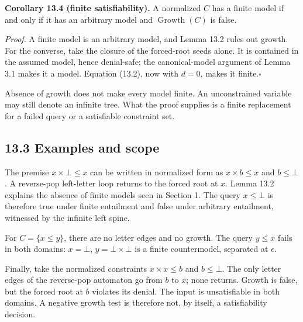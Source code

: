 \documentclass[
  11pt,
  a4paper,
]{article}
\newcounter{none} %
\begin{document}

\textbf{Corollary 13.4 (finite satisfiability).} A normalized \(C\) has
a finite model if and only if it has an arbitrary model and
\(\operatorname{Growth}(C)\) is false.

\emph{Proof.} A finite model is an arbitrary model, and Lemma 13.2 rules
out growth. For the converse, take the closure of the forced-root seeds
alone. It is contained in the assumed model, hence denial-safe; the
canonical-model argument of Lemma 3.1 makes it a model. Equation (13.2),
now with \(d=0\), makes it finite.\nobreak\hspace{.5em}\(\square\)

Absence of growth does not make every model finite. An unconstrained
variable may still denote an infinite tree. What the proof supplies is a
finite replacement for a failed query or a satisfiable constraint set.

\subsection{13.3 Examples and scope}\label{examples-and-scope}

The premise \(x\times\bot\le x\) can be written in normalized form as
\(x\times b\le x\) and \(b\le\bot\). A reverse-pop left-letter loop
returns to the forced root at \(x\). Lemma 13.2 explains the absence of
finite models seen in Section 1. The query \(x\le\bot\) is therefore
true under finite entailment and false under arbitrary entailment,
witnessed by the infinite left spine.

For \(C=\{x\le y\}\), there are no letter edges and no growth. The query
\(y\le x\) fails in both domains: \(x=\bot\), \(y=\bot\times\bot\) is a
finite countermodel, separated at \(\epsilon\).

Finally, take the normalized constraints \(x\times x\le b\) and
\(b\le\bot\). The only letter edges of the reverse-pop automaton go from
\(b\) to \(x\); none returns. Growth is false, but the forced root at
\(b\) violates its denial. The input is unsatisfiable in both domains. A
negative growth test is therefore not, by itself, a satisfiability
decision.
\end{document}
